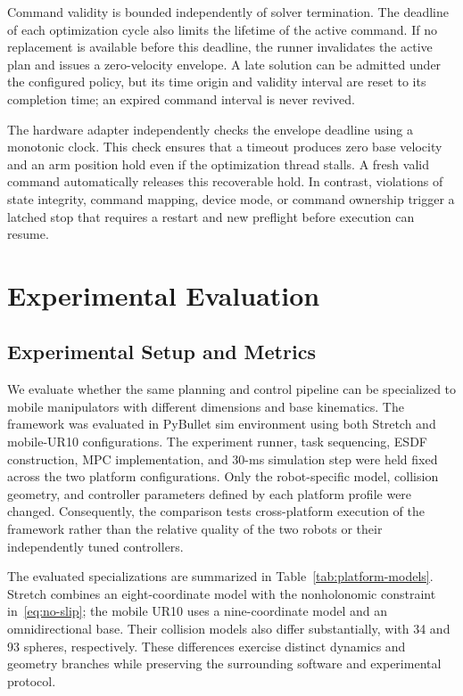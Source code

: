 \documentclass[conference]{IEEEtran}
\begin{document}
Command validity is bounded independently of solver termination.  The deadline
of each optimization cycle also limits the lifetime of the active command.  If
no replacement is available before this deadline, the runner invalidates the
active plan and issues a zero-velocity envelope.  A late solution can be
admitted under the configured policy, but its time origin and validity interval
are reset to its completion time; an expired command interval is never revived.

The hardware adapter independently checks the envelope deadline using a
monotonic clock.  This check ensures that a timeout produces zero base velocity
and an arm position hold even if the optimization thread stalls.  A fresh valid
command automatically releases this recoverable hold.  In contrast, violations
of state integrity, command mapping, device mode, or command ownership trigger a
latched stop that requires a restart and new preflight before execution can
resume.

\section{Experimental Evaluation}

\subsection{Experimental Setup and Metrics}

We evaluate whether the same planning and control pipeline can be specialized
to mobile manipulators with different dimensions and base kinematics.  The
framework was evaluated in PyBullet sim environment using both Stretch and mobile-UR10
configurations.  The experiment runner, task sequencing, ESDF construction,
MPC implementation, and 30-ms simulation step were held fixed across the two
platform configurations.
Only the robot-specific model, collision geometry, and controller parameters
defined by each platform profile were changed.  Consequently, the comparison
tests cross-platform execution of the framework rather than the relative
quality of the two robots or their independently tuned controllers.

The evaluated specializations are summarized in
Table~\ref{tab:platform-models}.  Stretch combines an eight-coordinate model
with the nonholonomic constraint in~\eqref{eq:no-slip}; the mobile UR10 uses a
nine-coordinate model and an omnidirectional base.  Their collision models
also differ substantially, with 34 and 93 spheres, respectively.  These
differences exercise distinct dynamics and geometry branches while preserving
the surrounding software and experimental protocol.
\end{document}
